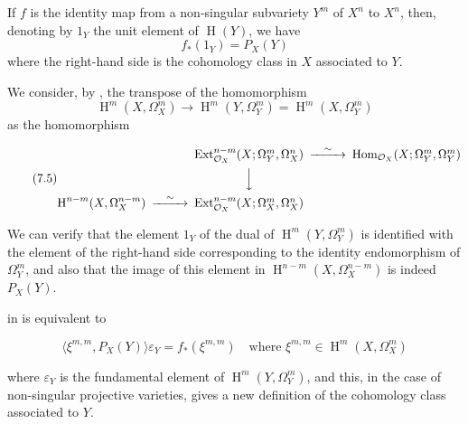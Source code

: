 \begin{theorem}\label{fga1-theorem-4}
  If $f$ is the identity map from a non-singular subvariety $Y^m$ of $X^n$ to $X^n$, then, denoting by $1_Y$ the unit element of $\operatorname{H}(Y)$, we have
  \begin{equation}\tag{7.4}\label{fga1-equation-7.4}
    f_*(1_Y) = P_X(Y)
  \end{equation}
  where the right-hand side is the cohomology class in $X$ associated to $Y$.
\end{theorem}

\begin{cproof}
  We consider, by , the transpose of the homomorphism
  \[
    \operatorname{H}^m(X,\Omega_X^m)
    \to \operatorname{H}^m(Y,\Omega_Y^m)
    = \operatorname{H}^m(X,\Omega_Y^m)
  \]
  as the homomorphism

  \begin{equation}\tag{7.5}\label{fga1-equation-7.5}
    \begin{CD}
      @.
      \operatorname{Ext}_{\mathcal{O}_X}^{n-m}(X;\Omega_Y^m,\Omega_X^n)
      @>\sim>>
      \operatorname{Hom}_{\mathcal{O}_X}(X;\Omega_Y^m,\Omega_Y^m)
      \\@. @VVV @.
      \\\operatorname{H}^{n-m}(X,\Omega_X^{n-m})
      @>\sim>>
      \operatorname{Ext}_{\mathcal{O}_X}^{n-m}(X;\Omega_X^m,\Omega_X^n)
    \end{CD}
  \end{equation}


  We can verify that the element $1_Y$ of the dual of $\operatorname{H}^m(Y,\Omega_Y^m)$ is identified with the element of the right-hand side corresponding to the identity endomorphism of $\Omega_Y^m$, and also that the image of this element in $\operatorname{H}^{n-m}(X,\Omega_X^{n-m})$ is indeed $P_X(Y)$.
\end{cproof}

 in  is equivalent to

\begin{equation}\tag{7.4 bis}\label{fga1-equation-7.4bis}
  \langle \xi^{m,m}, P_X(Y) \rangle \varepsilon_Y
  = f_*(\xi^{m,m})
  \quad\text{where }\xi^{m,m}\in\operatorname{H}^m(X,\Omega_X^m)
\end{equation}

where $\varepsilon_Y$ is the fundamental element of $\operatorname{H}^m(Y,\Omega_Y^m)$, and this, in the case of non-singular projective varieties, gives a new definition of the cohomology class associated to $Y$.

